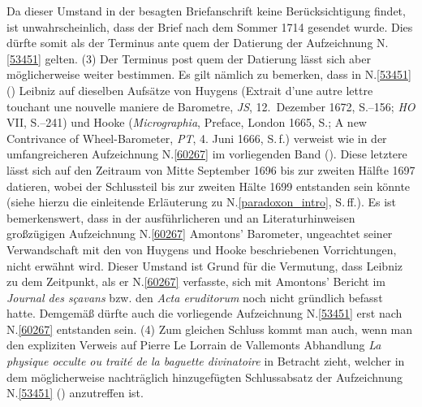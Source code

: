 Da dieser Umstand in der besagten Briefanschrift keine Berücksichtigung findet, ist unwahrscheinlich, dass der Brief nach dem Sommer 1714 gesendet wurde.
Dies dürfte somit als der Terminus ante quem der Datierung der Aufzeichnung N.\;\ref{53451} gelten.
\pend%
\pstart%
(3)
Der Terminus post quem der Datierung lässt sich aber möglicherweise weiter bestimmen.
Es gilt nämlich zu bemerken, dass in N.\;\ref{53451} () Leibniz auf dieselben Aufsätze von Huygens (\glqq Extrait d'une autre lettre touchant une nouvelle maniere de Barometre\grqq, \textit{JS}, 12.~Dezember 1672, S.--156;\cite{01522} \textit{HO} VII, S.--241)\cite{00113} und Hooke (\textit{Micrographia}, Preface, London 1665, S.\:[c3];\cite{00061} \glqq A new Contrivance of Wheel-Barometer\grqq, \textit{PT}, 4. Juni 1666, S.\,f.)\cite{01523} verweist wie in der umfangreicheren Aufzeichnung N.\;\ref{60267} im vorliegenden Band ().
Diese letztere lässt sich auf den Zeitraum von Mitte September 1696 bis zur zweiten Hälfte 1697 datieren, wobei der Schlussteil bis zur zweiten Hälte 1699 entstanden sein könnte (siehe hierzu die einleitende Erläuterung zu N.\;\ref{paradoxon_intro}, S.\;\pageref{paradoxonbarometricum_intro}\,ff.). %
Es ist bemerkenswert, dass in der ausführlicheren und an Literaturhinweisen großzügigen Aufzeichnung N.\;\ref{60267} Amontons' Barometer, ungeachtet seiner Verwandschaft mit den von Huygens und Hooke beschriebenen Vorrichtungen, nicht erwähnt wird.
Dieser Umstand ist Grund für die Vermutung, dass Leibniz zu dem Zeitpunkt, als er N.\;\ref{60267} verfasste, sich mit Amontons' Bericht im \textit{Journal des sçavans} bzw. den \textit{Acta eruditorum} noch nicht gründlich befasst hatte.
Demgemäß dürfte auch die vorliegende Aufzeichnung N.\;\ref{53451} erst nach N.\;\ref{60267} entstanden sein.
\pend%
\pstart%
(4)
Zum gleichen Schluss kommt man auch, wenn man den expliziten Verweis auf Pierre Le Lorrain de Vallemonts Abhandlung \textit{La physique occulte ou traité de la baguette divinatoire}\cite{01513} in Betracht zieht, welcher in dem möglicherweise nachträglich hinzugefügten Schlussabsatz der Aufzeichnung N.\;\ref{53451} () anzutreffen ist.
